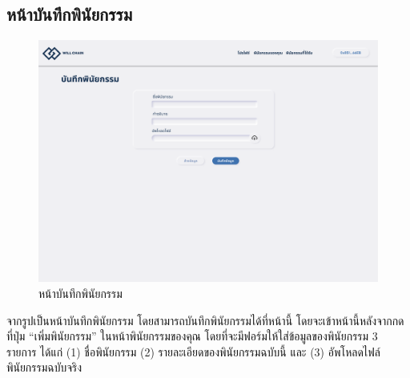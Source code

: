 \documentclass[12pt,oneside,openright,a4paper]{cpe-thai-project}
\begin{document}
\subsection{หน้าบันทึกพินัยกรรม}
		\begin{figure}[!thb]
			\centering
			\includegraphics[scale=0.2]{saveWill}
			\caption{หน้าบันทึกพินัยกรรม}
		\end{figure}
		\FloatBarrier
		\tab  จากรูปเป็นหน้าบันทึกพินัยกรรม โดยสามารถบันทึกพินัยกรรมได้ที่หน้านี้ โดยจะเข้าหน้านี้หลังจากกดที่ปุ่ม “เพิ่มพินัยกรรม” ในหน้าพินัยกรรมของคุณ โดยที่จะมีฟอร์มให้ใส่ข้อมูลของพินัยกรรม 3 รายการ ได้แก่ (1) ชื่อพินัยกรรม (2) รายละเอียดของพินัยกรรมฉบับนี้ และ (3) อัพโหลดไฟล์พินัยกรรมฉบับจริง
		
\clearpage
\end{document}
